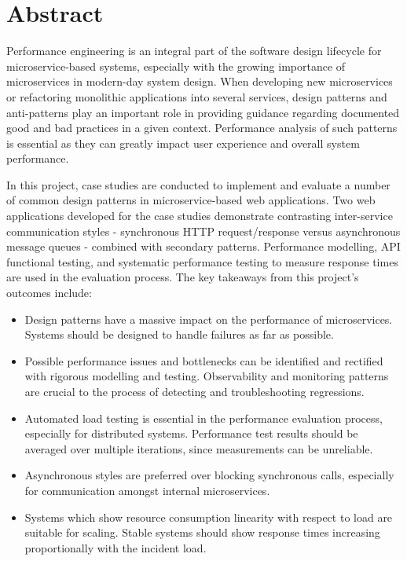 \chapter*{Abstract}

Performance engineering is an integral part of the software design lifecycle for microservice-based systems, especially with the growing importance of microservices in modern-day system design. When developing new microservices or refactoring monolithic applications into several services, design patterns and anti-patterns play an important role in providing guidance regarding documented good and bad practices in a given context. Performance analysis of such patterns is essential as they can greatly impact user experience and overall system performance.

In this project, case studies are conducted to implement and evaluate a number of common design patterns in microservice-based web applications. Two web applications developed for the case studies demonstrate contrasting inter-service communication styles - synchronous HTTP request/response versus asynchronous message queues - combined with secondary patterns. Performance modelling, API functional testing, and systematic performance testing to measure response times are used in the evaluation process. The key takeaways from this project's outcomes include:

\begin{itemize}
	\item Design patterns have a massive impact on the performance of microservices. Systems should be designed to handle failures as far as possible.
	\item Possible performance issues and bottlenecks can be identified and rectified with rigorous modelling and testing. Observability and monitoring patterns are crucial to the process of detecting and troubleshooting regressions.
	\item Automated load testing is essential in the performance evaluation process, especially for distributed systems. Performance test results should be averaged over multiple iterations, since measurements can be unreliable.
	\item Asynchronous styles are preferred over blocking synchronous calls, especially for communication amongst internal microservices.
	\item Systems which show resource consumption linearity with respect to load are suitable for scaling. Stable systems should show response times increasing proportionally with the incident load.
\end{itemize}

